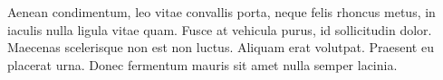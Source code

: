 \documentclass[a4paper]{article}
\begin{document}
\begin{pages}
\begin{Rightside}
	Aenean condimentum, leo vitae convallis porta, neque felis rhoncus metus, in iaculis nulla ligula vitae quam. Fusce at vehicula purus, id sollicitudin dolor. Maecenas scelerisque non est non luctus. Aliquam erat volutpat. Praesent eu placerat urna. Donec fermentum mauris sit amet nulla semper lacinia. 
    
    \endnumbering
  \end{Rightside}


\end{pages}
  \Pages
\end{document}
